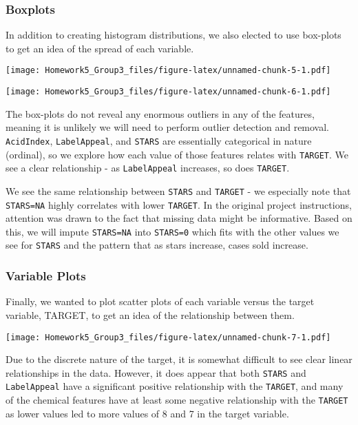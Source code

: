 \documentclass[
]{article}
\begin{document}
\hypertarget{boxplots}{%
\subsubsection{Boxplots}\label{boxplots}}

In addition to creating histogram distributions, we also elected to use
box-plots to get an idea of the spread of each variable.

\texttt{[image: Homework5\_Group3\_files/figure-latex/unnamed-chunk-5-1.pdf]}

\texttt{[image: Homework5\_Group3\_files/figure-latex/unnamed-chunk-6-1.pdf]}

The box-plots do not reveal any enormous outliers in any of the
features, meaning it is unlikely we will need to perform outlier
detection and removal. \texttt{AcidIndex}, \texttt{LabelAppeal}, and
\texttt{STARS} are essentially categorical in nature (ordinal), so we
explore how each value of those features relates with \texttt{TARGET}.
We see a clear relationship - as \texttt{LabelAppeal} increases, so does
\texttt{TARGET}.

We see the same relationship between \texttt{STARS} and \texttt{TARGET}
- we especially note that \texttt{STARS=NA} highly correlates with lower
\texttt{TARGET}. In the original project instructions, attention was
drawn to the fact that missing data might be informative. Based on this,
we will impute \texttt{STARS=NA} into \texttt{STARS=0} which fits with
the other values we see for \texttt{STARS} and the pattern that as stars
increase, cases sold increase.

\hypertarget{variable-plots}{%
\subsubsection{Variable Plots}\label{variable-plots}}

Finally, we wanted to plot scatter plots of each variable versus the
target variable, TARGET, to get an idea of the relationship between
them.

\texttt{[image: Homework5\_Group3\_files/figure-latex/unnamed-chunk-7-1.pdf]}

Due to the discrete nature of the target, it is somewhat difficult to
see clear linear relationships in the data. However, it does appear that
both \texttt{STARS} and \texttt{LabelAppeal} have a significant positive
relationship with the \texttt{TARGET}, and many of the chemical features
have at least some negative relationship with the \texttt{TARGET} as
lower values led to more values of 8 and 7 in the target variable.
\end{document}
